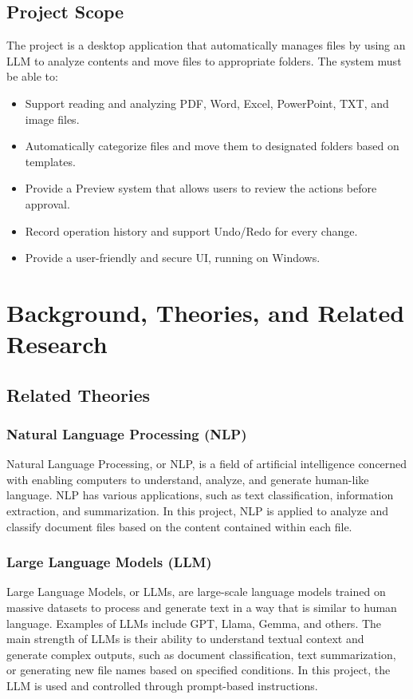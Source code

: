 \documentclass[12pt,oneside,openright,a4paper]{cpe-english-project}
\begin{document}
\section{Project Scope}
The project is a desktop application that automatically manages files by using an LLM to analyze contents and move files to appropriate folders. The system must be able to:

\begin{itemize}
\item Support reading and analyzing PDF, Word, Excel, PowerPoint, TXT, and image files.
\item Automatically categorize files and move them to designated folders based on templates.
\item Provide a Preview system that allows users to review the actions before approval.
\item Record operation history and support Undo/Redo for every change.
\item Provide a user-friendly and secure UI, running on Windows.
\end{itemize}
\chapter{Background, Theories, and Related Research}
\section{Related Theories}
\subsection{Natural Language Processing (NLP)}
Natural Language Processing, or NLP, is a field of artificial intelligence concerned with enabling computers to understand, analyze, and generate human-like language. NLP has various applications, such as text classification, information extraction, and summarization. In this project, NLP is applied to analyze and classify document files based on the content contained within each file.

\subsection{Large Language Models (LLM)}
Large Language Models, or LLMs, are large-scale language models trained on massive datasets to process and generate text in a way that is similar to human language. Examples of LLMs include GPT, Llama, Gemma, and others. The main strength of LLMs is their ability to understand textual context and generate complex outputs, such as document classification, text summarization, or generating new file names based on specified conditions. In this project, the LLM is used and controlled through prompt-based instructions.
\end{document}
